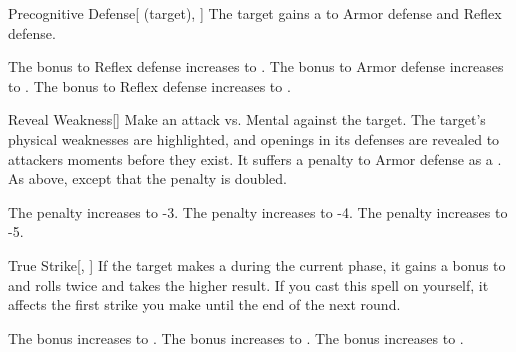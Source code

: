 \lowercase{\hypertarget{spell:Precognitive Defense}{}}\label{spell:Precognitive Defense}
\begin{attuneability}[Rank 1]{\hypertarget{spell:Precognitive Defense}{Precognitive Defense}}[ (target), ]
The target gains a   to Armor defense and Reflex defense.

\rankline
{} The bonus to Reflex defense increases to .
 The bonus to Armor defense increases to .
 The bonus to Reflex defense increases to .
\end{attuneability}
\vspace{0.25em}



\lowercase{\hypertarget{spell:Reveal Weakness}{}}\label{spell:Reveal Weakness}
\begin{freeability}[Rank 1]{\hypertarget{spell:Reveal Weakness}{Reveal Weakness}}[]
Make an attack vs. Mental against the target.
\hit The target's physical weaknesses are highlighted, and openings in its defenses are revealed to attackers moments before they exist.
It suffers a  penalty to Armor defense as a .
\crit As above, except that the penalty is doubled.

\rankline
{} The penalty increases to -3.
 The penalty increases to -4.
 The penalty increases to -5.
\end{freeability}
\vspace{0.25em}



\lowercase{\hypertarget{spell:True Strike}{}}\label{spell:True Strike}
\begin{freeability}[Rank 1]{\hypertarget{spell:True Strike}{True Strike}}[, ]
If the target makes a  during the current phase,
it gains a  bonus to  and rolls twice and takes the higher result.
If you cast this spell on yourself, it affects the first strike you make until the end of the next round.

\rankline
{} The bonus increases to .
 The bonus increases to .
 The bonus increases to .
\end{freeability}
\vspace{0.25em}



